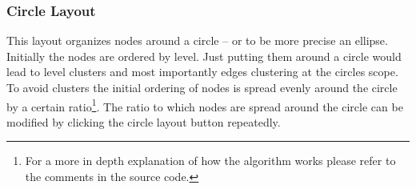 \documentclass[10pt, a4paper]{article}
\begin{document}
\subsubsection{Circle Layout}
\label{label:circleLayout}

This layout organizes nodes around a circle -- or to be more precise an ellipse. Initially the nodes are ordered by level. Just putting them around a circle would lead to level clusters and most importantly edges clustering at the circles scope. To avoid clusters the initial ordering of nodes is spread evenly around the circle by a certain ratio\footnote{For a more in depth explanation of how the algorithm works please refer to the comments in the source code.}. The ratio to which nodes are spread around the circle can be modified by clicking the circle layout button repeatedly.





\newpage
\end{document}
